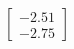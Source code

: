 \documentclass[preview]{standalone}
\begin{document}
\begin{align*}
\begin{bmatrix} -2.51 \\ -2.75 \end{bmatrix}
\end{align*}
\end{document}
